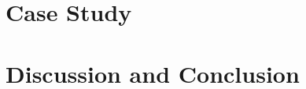 \section{Case Study}
\label{ch:results1}



% 

\section{Discussion and Conclusion}
\label{ch:conclusion1}







